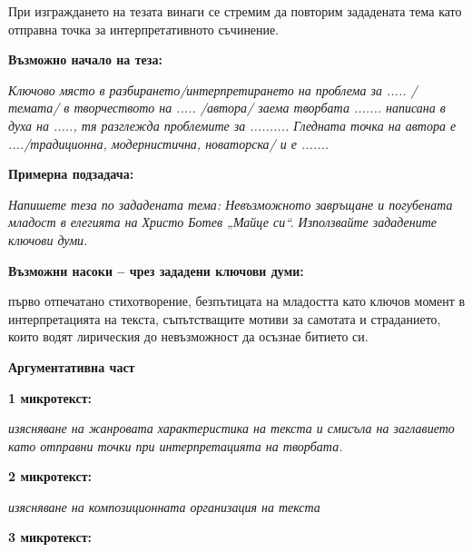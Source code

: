 \documentclass[12pt,a4paper]{article}
\begin{document}
\medskip

При изграждането на тезата винаги се стремим да повторим зададената
тема като отправна точка за интерпретативното съчинение.

\medskip

\textbf{Възможно начало на теза:}

\emph{
Ключово място в разбирането/интерпретирането на проблема за
..... /темата/ в творчеството на ..... /автора/ заема творбата .......
написана в духа на ....., тя разглежда проблемите за ..........
Гледната точка на автора е ..../традиционна, модернистична,
новаторска/ и е .......
}

\vspace{0.3cm}


\textbf{Примерна подзадача:}

\emph{
Напишете теза по зададената тема:
Невъзможното завръщане и погубената младост в елегията
на Христо Ботев „Майце си“. Използвайте зададените ключови думи.
}

\medskip

\textbf{Възможни насоки -- чрез зададени ключови думи:}

първо отпечатано стихотворение, безпътицата на младостта като
ключов момент в интерпретацията на текста, съпътстващите мотиви
за самотата и страданието, които водят лирическия до невъзможност
да осъзнае битието си.

\vspace{0.3cm}


\textbf{Аргументативна част}

\medskip

\textbf{1 микротекст:}

\emph{
изясняване на жанровата характеристика на текста и смисъла
на заглавието като отправни точки при интерпретацията на творбата.
}

\medskip

\textbf{2 микротекст:}

\emph{
изясняване на композиционната организация на текста
}

\medskip

\textbf{3 микротекст:}
\end{document}
